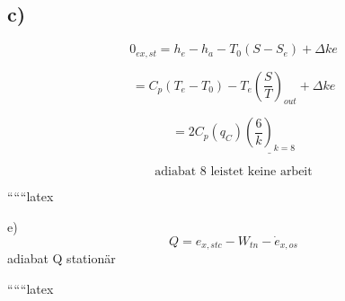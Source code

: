 

\subsection*{c)}

\[
0_{ex,st} = h_e - h_a - T_0 (S - S_e) + \Delta ke
\]

\[
= C_p (T_e - T_0) - T_e \left( \frac{S}{T} \right)_{out} + \Delta ke
\]

\[
= 2 C_p (q_C) \underline{\left( \frac{6}{k} \right)_{k=8}}
\]

\[
\text{adiabat 8 leistet keine arbeit}
\]

``````latex


e) \\
\[
Q = e_{x,stc} - W_{tn} - \dot{e}_{x,os}
\]
adiabat Q stationär

``````latex